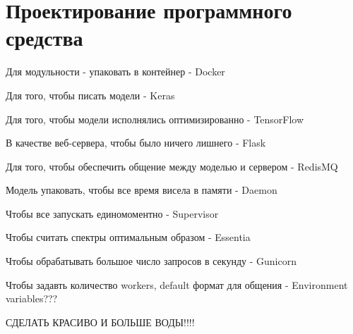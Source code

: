 \section{Проектирование программного средства}
\label{sec:design}

Для модульности - упаковать в контейнер - Docker

Для того, чтобы писать модели - Keras

Для того, чтобы модели исполнялись оптимизированно - TensorFlow

В качестве веб-сервера, чтобы было ничего лишнего - Flask

Для того, чтобы обеспечить общение между моделью и сервером - RedisMQ

Модель упаковать, чтобы все время висела в памяти - Daemon

Чтобы все запускать единомоментно - Supervisor

Чтобы считать спектры оптимальным образом - Essentia

Чтобы обрабатывать большое число запросов в секунду - Gunicorn

Чтобы задавть количество workers, default формат для общения - Environment variables???

СДЕЛАТЬ КРАСИВО И БОЛЬШЕ ВОДЫ!!!!
